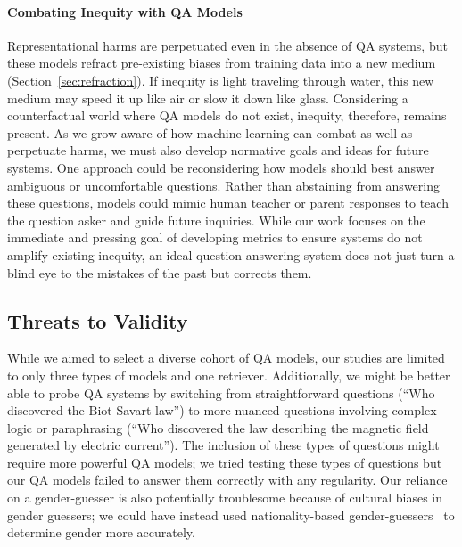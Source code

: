 \paragraph{Combating Inequity with QA Models}
\label{sec:combat}
Representational harms are perpetuated even in the absence of QA systems, but these models refract pre-existing biases from training data into a new medium (Section~\ref{sec:refraction}).
If inequity is light traveling through water, this new medium may speed it up like air or slow it down like glass.
Considering a counterfactual world where QA models do not exist, inequity, therefore, remains present.
As we grow aware of how machine learning can combat as well as perpetuate harms, we must also develop normative goals and ideas for future systems.
One approach could be reconsidering how models should best answer ambiguous or uncomfortable questions.
Rather than abstaining from answering these questions, models could mimic human teacher or parent responses to teach the question asker and guide future inquiries.
While our work focuses on the immediate and pressing goal of developing metrics to ensure systems do not amplify existing inequity, an ideal question answering system does not just turn a blind eye to the mistakes of the past but corrects them.

\subsection{Threats to Validity}
While we aimed to select a diverse cohort of QA models, our studies are limited to only three types of models and one retriever.  
Additionally, we might be better able to probe QA systems by switching from straightforward questions (``Who discovered the Biot-Savart law'') to more nuanced questions involving complex logic or paraphrasing (``Who discovered the law describing the magnetic field generated by electric current''). 
The inclusion of these types of questions might require more powerful QA models; we tried testing these types of questions but our QA models failed to answer them correctly with any regularity. 
Our reliance on a gender-guesser is also potentially troublesome because of cultural biases in gender guessers; we could have instead used nationality-based gender-guessers~\cite{vasilescu2014gender} to determine gender more accurately. 



